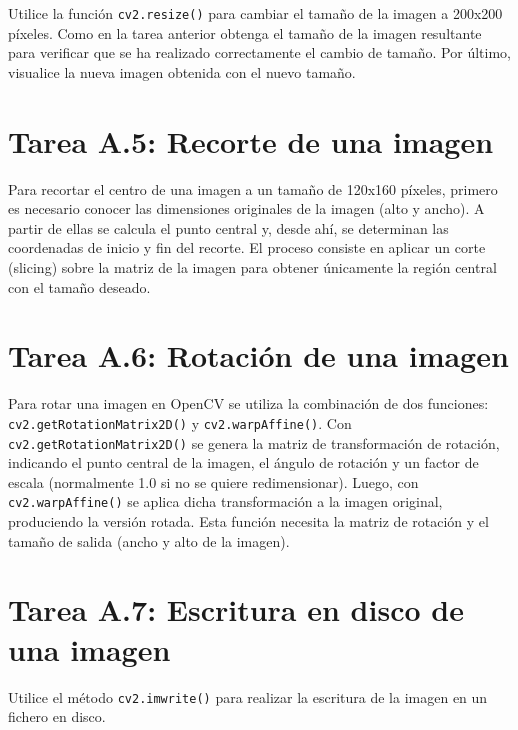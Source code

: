 Utilice la función \texttt{cv2.resize()} para cambiar el tamaño de la imagen a 200x200 píxeles. Como en la tarea anterior obtenga el tamaño de la imagen resultante para verificar que se ha realizado correctamente el cambio de tamaño. Por último, visualice la nueva imagen obtenida con el nuevo tamaño.


\section*{Tarea A.5: Recorte de una imagen}

Para recortar el centro de una imagen a un tamaño de 120x160 píxeles, primero es necesario conocer las dimensiones originales de la imagen (alto y ancho). A partir de ellas se calcula el punto central y, desde ahí, se determinan las coordenadas de inicio y fin del recorte. El proceso consiste en aplicar un corte (slicing) sobre la matriz de la imagen para obtener únicamente la región central con el tamaño deseado.

\section*{Tarea A.6: Rotación de una imagen}

Para rotar una imagen en OpenCV se utiliza la combinación de dos funciones: \texttt{cv2.getRotationMatrix2D()} y \texttt{cv2.warpAffine()}.
Con \texttt{cv2.getRotationMatrix2D()} se genera la matriz de transformación de rotación, indicando el punto central de la imagen, el ángulo de rotación y un factor de escala (normalmente 1.0 si no se quiere redimensionar).
Luego, con \texttt{cv2.warpAffine()} se aplica dicha transformación a la imagen original, produciendo la versión rotada. Esta función necesita la matriz de rotación y el tamaño de salida (ancho y alto de la imagen).

\section*{Tarea A.7: Escritura en disco de una imagen}
Utilice el método \texttt{cv2.imwrite()} para realizar la escritura de la imagen en un fichero en disco.


